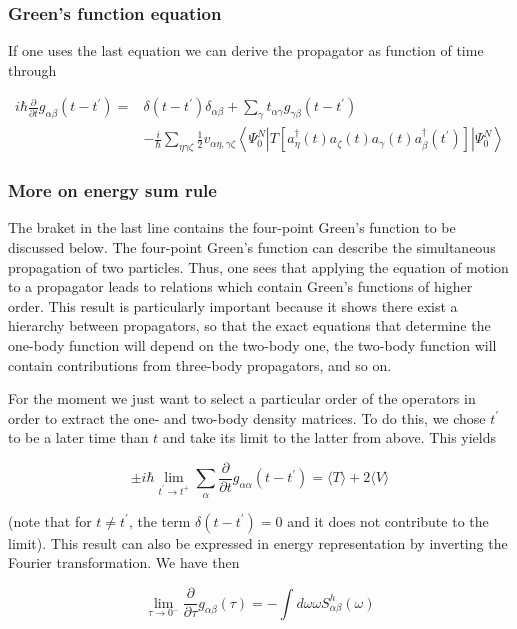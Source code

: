 \documentclass[compress]{beamer}
\begin{document}
\frame
{
\frametitle{Green's function equation}
\begin{small}
{\scriptsize

If one uses the last equation we can derive the propagator as function of time through

\[
\begin{aligned}
i \hbar \frac{\partial}{\partial t} g_{\alpha \beta}\left(t-t^{\prime}\right)= & \delta\left(t-t^{\prime}\right) \delta_{\alpha \beta}+\sum_{\gamma} t_{\alpha \gamma} g_{\gamma \beta}\left(t-t^{\prime}\right) \\
& -\frac{i}{\hbar} \sum_{\eta \gamma \zeta} \frac{1}{2} v_{\alpha \eta, \gamma \zeta}\left\langle\Psi_{0}^{N}\left|T\left[a_{\eta}^{\dagger}(t) a_{\zeta}(t) a_{\gamma}(t) a_{\beta}^{\dagger}\left(t^{\prime}\right)\right]\right| \Psi_{0}^{N}\right\rangle
\end{aligned}
\]

}
\end{small}
}


\frame
{
\frametitle{More on energy sum rule}
\begin{small}
{\scriptsize

The braket in the last line contains the four-point Green's function to be discussed below.
The four-point Green's function can describe the simultaneous propagation of
two particles. Thus, one sees that applying the equation of motion to
a propagator leads to relations which contain Green's functions of
higher order. This result is particularly important because it shows
there exist a hierarchy between propagators, so that the exact
equations that determine the one-body function will depend on the
two-body one, the two-body function will contain contributions from
three-body propagators, and so on.

For the moment we just want to select a particular order of the
operators in order to extract the one- and two-body
density matrices. To do this, we chose $t^{\prime}$ to be a later time
than $t$ and take its limit to the latter from above. This yields

$$
\pm i \hbar \lim _{t^{\prime} \rightarrow t^{+}} \sum_{\alpha} \frac{\partial}{\partial t} g_{\alpha \alpha}\left(t-t^{\prime}\right)=\langle T\rangle+2\langle V\rangle
$$

(note that for $t \neq t^{\prime}$, the term
$\delta\left(t-t^{\prime}\right)=0$ and it does not contribute to the
limit). This result can also be expressed in energy representation by
inverting the Fourier transformation. We have then

$$
\lim _{\tau \rightarrow 0^{-}} \frac{\partial}{\partial \tau} g_{\alpha \beta}(\tau)=-\int d \omega \omega S_{\alpha \beta}^{h}(\omega)
$$

}
\end{small}
}
\end{document}
